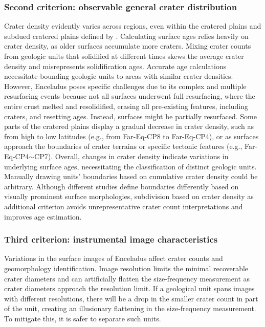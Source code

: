 \documentclass[preprint,12pt,3p,times,authoryear]{elsarticle}
\begin{document}
\subsubsection{Second criterion: observable general crater distribution}
Crater density evidently varies across regions, even within the cratered plains and subdued cratered plains defined by \citet{CrowWillard2015}. Calculating surface ages relies heavily on crater density, as older surfaces accumulate more craters. Mixing crater counts from geologic units that solidified at different times skews the average crater density and misrepresents solidification ages. Accurate age calculations necessitate bounding geologic units to areas with similar crater densities. However, Enceladus poses specific challenges due to its complex and multiple resurfacing events because not all surfaces underwent full resurfacing, where the entire crust melted and resolidified, erasing all pre-existing features, including craters, and resetting ages. Instead, surfaces might be partially resurfaced. Some parts of the cratered plains display a gradual decrease in crater density, such as from high to low latitudes (e.g., from Far-Eq-CP8 to Far-Eq-CP4), or as surfaces approach the boundaries of crater terrains or specific tectonic features (e.g., Far-Eq-CP4$\sim$CP7). Overall, changes in crater density indicate variations in underlying surface ages, necessitating the classification of distinct geologic units.\\

Manually drawing units’ boundaries based on cumulative crater density could be arbitrary. Although different studies define boundaries differently based on visually prominent surface morphologies, subdivision based on crater density as additional criterion avoids unrepresentative crater count interpretations and improves age estimation.

\subsubsection{Third criterion: instrumental image characteristics}
Variations in the surface images of Enceladus affect crater counts and geomorphology identification. Image resolution limits the minimal recoverable crater diameters and can artificially flatten the size-frequency measurement as crater diameters approach the resolution limit. If a geological unit spans images with different resolutions, there will be a drop in the smaller crater count in part of the unit, creating an illusionary flattening in the size-frequency measurement. To mitigate this, it is safer to separate such units.
\end{document}
